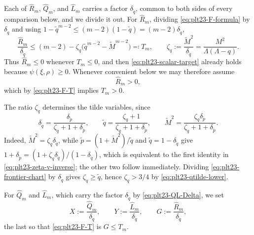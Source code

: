 ﻿\documentclass[11pt]{article}
\numberwithin{equation}{section}
\begin{document}
Each of $\widehat R_m$, $\widehat Q_m$, and $\widehat L_m$ carries a factor $\delta_{\tilde q}$, common to both sides of every comparison below, and we divide it out.
For $\widehat R_m$, dividing \eqref{eq:plt23-F-formula} by $\delta_{\tilde q}$ and using $1-\tilde q^{m-2}\le(m-2)(1-\tilde q)=(m-2)\delta_{\tilde q}$,
\begin{equation}\label{eq:plt23-F-T}
  \frac{\widehat R_m}{\delta_{\tilde q}}
  \le(m-2)-\zeta_q\bigl(\tilde q^{m-2}-\tilde M^{m-2}\bigr)
  \eqqcolon T_m,
  \qquad
  \zeta_q:=\frac{\tilde M^2}{\delta_{\tilde q}}=\frac{M^2}{\Lambda(\Lambda-q)}.
\end{equation}
Thus $\widehat R_m\le0$ whenever $T_m\le0$, and then \eqref{eq:plt23-scalar-target} already holds because $\psi(\xi,\rho)\ge0$.
Whenever convenient below we may therefore assume
\begin{equation}\label{eq:plt23-F-positive}
  \widehat R_m>0,
\end{equation}
which by \eqref{eq:plt23-F-T} implies $T_m>0$.

The ratio $\zeta_q$ determines the tilde variables, since
\begin{equation}\label{eq:plt23-zeta-v-inverse}
  \delta_{\tilde q}=\frac{\delta_{\tilde p}}{\zeta_q+1+\delta_{\tilde p}},
  \qquad
  \tilde q=\frac{\zeta_q+1}{\zeta_q+1+\delta_{\tilde p}},
  \qquad
  \tilde M^2=\frac{\zeta_q\delta_{\tilde p}}{\zeta_q+1+\delta_{\tilde p}}.
\end{equation}
Indeed, $\tilde M^2=\zeta_q\delta_{\tilde q}$, while $\tilde p=(1+\tilde M^2)/\tilde q$ and $\tilde q=1-\delta_{\tilde q}$ give $1+\delta_{\tilde p}=(1+\zeta_q\delta_{\tilde q})/(1-\delta_{\tilde q})$, which is equivalent to the first identity in \eqref{eq:plt23-zeta-v-inverse}; the other two follow immediately.
Dividing \eqref{eq:plt23-frontier-chart} by $\delta_{\tilde q}$ gives $\zeta_q\ge\tilde q$, hence $\zeta_q>3/4$ by \eqref{eq:plt23-qtilde-lower}.

For $\widehat Q_m$ and $\widehat L_m$, which carry the factor $\delta_{\tilde q}$ by \eqref{eq:plt23-QL-Delta}, we set
\[
  X:=\frac{\widehat Q_m}{\delta_{\tilde q}},
  \qquad
  Y:=\frac{\widehat L_m}{\delta_{\tilde q}},
  \qquad
  G:=\frac{\widehat R_m}{\delta_{\tilde q}},
\]
the last so that \eqref{eq:plt23-F-T} is $G\le T_m$.
\end{document}

